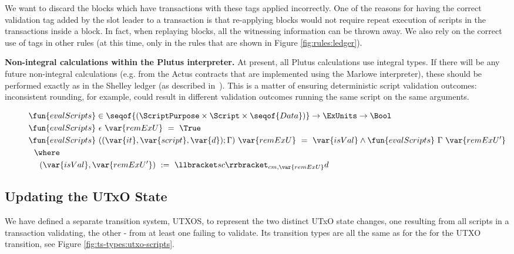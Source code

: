 We want to
discard the blocks which have transactions with these tags
applied incorrectly.
One of the reasons for having the correct validation tag added by the slot leader
to a transaction is that re-applying blocks would not require repeat
execution of scripts in the transactions inside a block. In fact, when replaying
blocks, all the witnessing information can be thrown away.
We also rely on the correct use of tags in other rules (at this time, only in
the rules that are shown in Figure \ref{fig:rules:ledger}).


\textbf{Non-integral calculations within the Plutus interpreter.} At present, all Plutus calculations use integral types. If there
will be any future non-integral calculations (e.g. from the Actus contracts that are implemented using
the Marlowe interpreter), these should
be performed exactly as in the Shelley ledger (as described in~\cite{non_int}). This is a matter of
ensuring deterministic script validation outcomes: inconsistent rounding, for example, could
result in different validation outcomes running the same script on the same
arguments.

\begin{figure}[htb]
  \begin{align*}
    & \fun{evalScripts} \in \seqof{(\ScriptPurpose \times \Script \times \seqof{Data})} \to \ExUnits \to \Bool \\
    & \fun{evalScripts}~\epsilon~\var{remExU}~=~\True \\
    & \fun{evalScripts}~((\var{it}, \var{script}, \var{d});\Gamma)~\var{remExU}~=~
      \var{isVal} \land \fun{evalScripts}~\Gamma~\var{remExU'} \\
    & ~~\where \\
    & ~~~~ (\var{isVal},\var{remExU'})~:=~ \llbracket sc \rrbracket_{cm,\var{remExU}} d
  \end{align*}
\end{figure}

\subsection{Updating the UTxO State}
\label{sec:utxo-state-trans}

We have defined a separate transition system, UTXOS, to represent the two distinct
UTxO state changes, one resulting from all scripts in a transaction validating,
the other - from at least one failing to validate. Its transition types
are all the same as for the for the UTXO transition, see Figure
\ref{fig:ts-types:utxo-scripts}.

